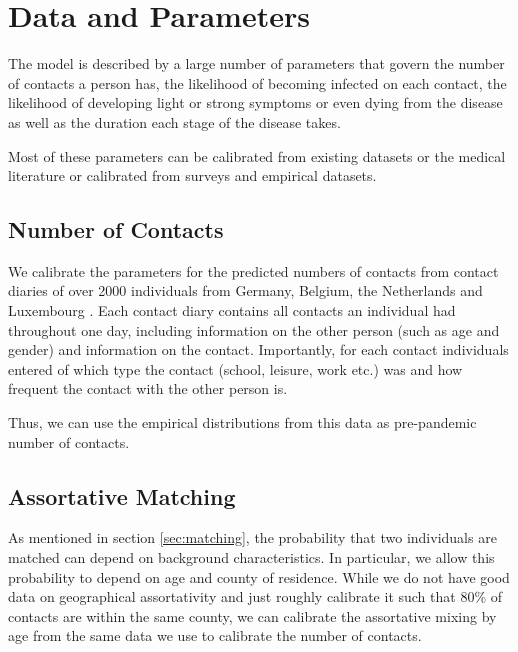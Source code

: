 \section{Data and Parameters}
\label{sec:calibration_and_estimation}

The model is described by a large number of parameters that govern the number of
contacts a person has, the likelihood of becoming infected on each contact, the
likelihood of developing light or strong symptoms or even dying from the disease as well
as the duration each stage of the disease takes.

Most of these parameters can be calibrated from existing datasets or the medical
literature or calibrated from surveys and empirical datasets.




\subsection{Number of Contacts}
\label{sub:number_of_contacts}

We calibrate the parameters for the predicted numbers of contacts from contact diaries
of over 2000 individuals from Germany, Belgium, the Netherlands and Luxembourg
\citep{Mossong2008}. Each contact diary contains all contacts an individual had
throughout one day, including information on the other person (such as age and gender)
and information on the contact. Importantly, for each contact individuals entered of
which type the contact (school, leisure, work etc.) was and how frequent the contact
with the other person is.

Thus, we can use the empirical distributions from this data as pre-pandemic number of
contacts.


\FloatBarrier


\subsection{Assortative Matching}

As mentioned in section \ref{sec:matching}, the probability that two individuals are
matched can depend on background characteristics. In particular, we allow this
probability to depend on age and county of residence. While we do not have good data on
geographical assortativity and just roughly calibrate it such that 80\% of contacts are
within the same county, we can calibrate the assortative mixing by age from the same
data we use to calibrate the number of contacts.

